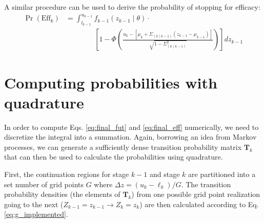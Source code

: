 \documentclass{article}
\begin{document}
A similar procedure can be used to derive the probability of stopping for efficacy:
\begin{align} \label{eq:final_eff}
    \Pr(\text{Eff}_k) &= \int_{l_{k-1}}^{u_{k-1}} f_{k-1}(z_{k-1}\mid\theta) \cdot \nonumber \\
    &\qquad\qquad\left[ 1 - \Phi\left( \frac{u_k -\left[\mu_k + \Sigma_{(k \mid k-1)}(z_{k-1} - \mu_{k-1})\right]}{\sqrt{1 - \Sigma_{(k \mid k-1)}^2}} \right) \right] dz_{k-1}
\end{align}
%
\section{Computing probabilities with quadrature}
%
In order to compute Eqs. \eqref{eq:final_fut} and \eqref{eq:final_eff} numerically, we need to discretize the integral into a summation. Again, borrowing an idea from Markov processes, we can generate a sufficiently dense transition probability matrix $\mathbf{T}_k$ that can then be used to calculate the probabilities using quadrature.

First, the continuation regions for stage $k-1$ and stage $k$ are partitioned into a set number of grid points $G$ where $\Delta z =(u_k-\ell_k)/G$. The transition probability densities (the elements of $\mathbf{T}_k$) from one possible grid point realization going to the next ($Z_{k-1}=z_{k-1} \to Z_k=z_k$) are then calculated according to Eq. \eqref{eq:g_implemented}.
%
\begin{center}
\end{center}
\end{document}
